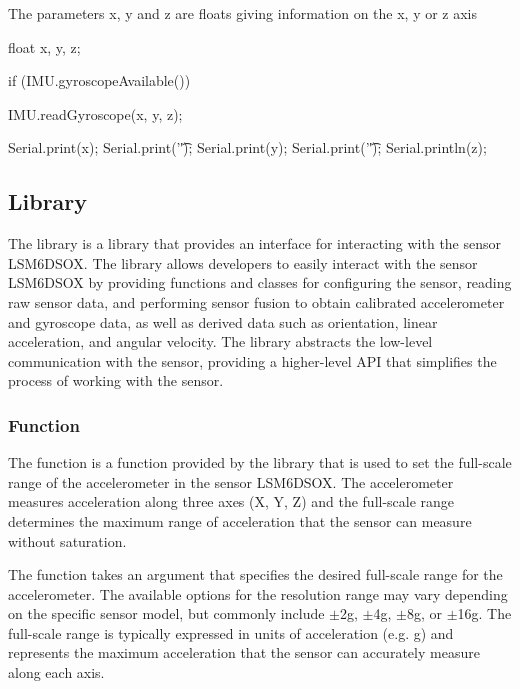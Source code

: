The parameters x, y and z are floats giving information on the x, y or z axis 

\begin{Arduino}
	float x, y, z;
	
	if (IMU.gyroscopeAvailable()) {
		IMU.readGyroscope(x, y, z);
		
		Serial.print(x);
		Serial.print('\t');
		Serial.print(y);
		Serial.print('\t');
		Serial.println(z);	}
\end{Arduino}



\subsection{Library }

The library  is a library that provides an interface for interacting with the sensor LSM6DSOX. The library  allows developers to easily interact with the sensor LSM6DSOX by providing functions and classes for configuring the sensor, reading raw sensor data, and performing sensor fusion to obtain calibrated accelerometer and gyroscope data, as well as derived data such as orientation, linear acceleration, and angular velocity. The library abstracts the low-level communication with the sensor, providing a higher-level API that simplifies the process of working with the sensor.

\subsubsection{Function }
The function  is a function provided by the library  that is used to set the full-scale range of the accelerometer in the sensor  LSM6DSOX. The accelerometer measures acceleration along three axes (X, Y, Z) and the full-scale range determines the maximum range of acceleration that the sensor can measure without saturation.

The function takes an argument that specifies the desired full-scale range for the accelerometer. The available options for the resolution range may vary depending on the specific sensor model, but commonly include $\pm$2g, $\pm$4g, $\pm$8g, or $\pm$16g. The full-scale range is typically expressed in units of acceleration (e.g. g) and represents the maximum acceleration that the sensor can accurately measure along each axis.

